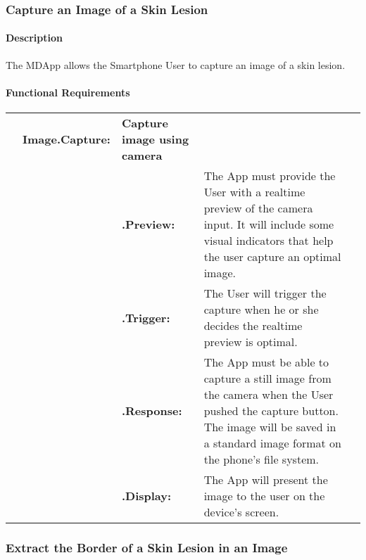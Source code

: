 
        \subsubsection{Capture an Image of a Skin Lesion}
            \paragraph{Description}

            The MDApp allows the Smartphone User to capture an image of a skin lesion.

            \paragraph{Functional Requirements}


                {\renewcommand{\arraystretch}{1.8}%
                \begin{longtable}[H]{ >{\bfseries}l >{\bfseries}l >{\bfseries}l p{9.5cm} l }

                    \hline
                    & \multicolumn{2}{>{\bfseries}l}
                    {Image.Capture:} & \textbf{Capture image using camera}  \\

                    & & .Preview: &  The App must provide the User with a realtime preview of the camera input. It will include some visual indicators that help the user capture an optimal image. \\

                    & & .Trigger: & The User will trigger the capture when he or she decides the realtime preview is optimal. \\

                    & & .Response: & The App must be able to capture a still image from the camera when the User pushed the capture button. The image will be saved in a standard image format on the phone’s file system. \\

                    & & .Display: & The App will present the image to the user on the device’s screen. \\

                    \hline
                \end{longtable}


        \subsubsection{Extract the Border of a Skin Lesion in an Image}

}
